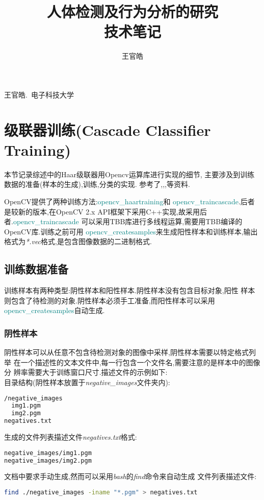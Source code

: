 \documentclass[10pt,technote]{IEEEtran}
\begin{document}
\title{人体检测及行为分析的研究\\技术笔记}
\author{王官皓}

%
{王官皓.~电子科技大学}


\maketitle
\IEEEdisplaynontitleabstractindextext
\section{级联器训练(Cascade Classifier Training)}
本节记录综述\cite{bib1}中的Haar级联器用Opencv运算库进行实现的细节,
主要涉及到训练数据的准备(样本的生成),训练,分类的实现.
参考了\cite{bib2},\cite{bib3},\cite{bib4},\cite{bib5}等资料.

OpenCV提供了两种训练方法:\textcolor{teal}{opencv\_haartraining}和
\textcolor{teal}{opencv\_traincascade}.后者是较新的版本,在OpenCV 2.x
API框架下采用C++实现,故采用后者.\textcolor{teal}{opencv\_traincascade}
可以采用TBB库进行多线程运算,需要用TBB编译的OpenCV库.训练之前可用
\textcolor{teal}{opencv\_createsamples}来生成阳性样本和训练样本,输出
格式为\textit{*.vec}格式,是包含图像数据的二进制格式.
\subsection{训练数据准备}
训练样本有两种类型:阴性样本和阳性样本.阴性样本没有包含目标对象,阳性
样本则包含了待检测的对象.阴性样本必须手工准备,而阳性样本可以采用
\textcolor{teal}{opencv\_createsamples}自动生成.
\subsubsection{阴性样本}
阴性样本可以从任意不包含待检测对象的图像中采样,阴性样本需要以特定格式列举
在一个描述性的文本文件中,每一行包含一个文件名,需要注意的是样本中的图像分
辨率需要大于训练窗口尺寸.描述文件的示例如下:\\
目录结构(阴性样本放置于\textit{negative\_images}文件夹内):
\begin{lstlisting}[language=bash]
/negative_images
  img1.pgm
  img2.pgm
negatives.txt
\end{lstlisting}
生成的文件列表描述文件\textit{negatives.txt}格式:
\begin{lstlisting}[language=bash]
negative_images/img1.pgm
negative_images/img2.pgm
\end{lstlisting}
文档中要求手动生成,然而可以采用\textit{bash}的\textit{find}命令来自动生成
文件列表描述文件:
\begin{lstlisting}[language=bash]
find ./negative_images -iname "*.pgm" > negatives.txt
\end{lstlisting}
\end{document}
